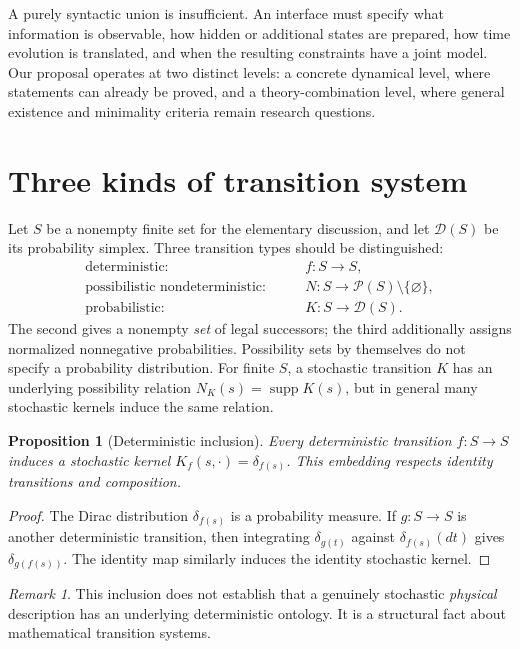 \documentclass[11pt,letterpaper]{article}
\newtheorem{proposition}[theorem]{Proposition}
\theoremstyle{definition}
\theoremstyle{remark}
\newtheorem{remark}[theorem]{Remark}
\newcommand{\D}{\mathcal D}
\newcommand{\Pp}{\mathcal P}
\newcommand{\supp}{\operatorname{supp}}
\begin{document}
A purely syntactic union is insufficient. An interface must specify what information is observable, how hidden or additional states are prepared, how time evolution is translated, and when the resulting constraints have a joint model. Our proposal operates at two distinct levels: a concrete dynamical level, where statements can already be proved, and a theory-combination level, where general existence and minimality criteria remain research questions.

\section{Three kinds of transition system}
Let $S$ be a nonempty finite set for the elementary discussion, and let $\D(S)$ be its probability simplex. Three transition types should be distinguished:
\begin{align}
\text{deterministic:}\qquad &f:S\longrightarrow S,\\
\text{possibilistic nondeterministic:}\qquad &N:S\longrightarrow\Pp(S)\setminus\{\varnothing\},\\
\text{probabilistic:}\qquad &K:S\longrightarrow\D(S).
\end{align}
The second gives a nonempty \emph{set} of legal successors; the third additionally assigns normalized nonnegative probabilities. Possibility sets by themselves do not specify a probability distribution. For finite $S$, a stochastic transition $K$ has an underlying possibility relation $N_K(s)=\supp K(s)$, but in general many stochastic kernels induce the same relation.

\begin{proposition}[Deterministic inclusion]\label{prop:dirac}
Every deterministic transition $f:S\to S$ induces a stochastic kernel $K_f(s,\cdot)=\delta_{f(s)}$. This embedding respects identity transitions and composition.
\end{proposition}
\begin{proof}
The Dirac distribution $\delta_{f(s)}$ is a probability measure. If $g:S\to S$ is another deterministic transition, then integrating $\delta_{g(t)}$ against $\delta_{f(s)}(dt)$ gives $\delta_{g(f(s))}$. The identity map similarly induces the identity stochastic kernel.
\end{proof}

\begin{remark}
This inclusion does not establish that a genuinely stochastic \emph{physical} description has an underlying deterministic ontology. It is a structural fact about mathematical transition systems.
\end{remark}
\end{document}
